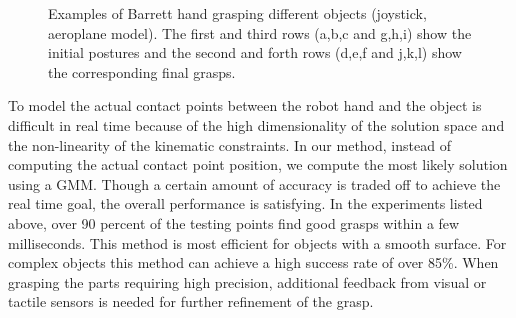 \begin{figure}

  \caption{\scriptsize{Examples of Barrett hand grasping different objects (joystick, aeroplane model). The first and third rows (a,b,c and g,h,i) show the initial postures and the second and forth rows (d,e,f and j,k,l) show the corresponding final grasps.}
}
    \label{barrett2}
\end{figure}




To model the actual contact points between the robot hand and the object is difficult in real time because of the high dimensionality of the solution space and the non-linearity of the kinematic constraints. In our method, instead of computing the actual contact point position, we compute the most likely solution using a GMM. Though a certain amount of accuracy is traded off to achieve the real time goal, the overall performance is satisfying. In the experiments listed above, over 90 percent of the testing points find good grasps within a few milliseconds. This method is most efficient for objects with a smooth surface. For complex objects this method can achieve a high success rate of over 85\%. When grasping the parts requiring high precision, additional feedback from visual or tactile sensors is needed for further refinement of the grasp.

